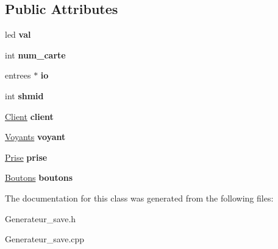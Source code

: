 \subsection*{Public Attributes}
\begin{DoxyCompactItemize}
\item 
\mbox{\label{classGenerateurSave_a0f29d24e65c8a4abcd21fc7a141b22cd}} 
led {\bfseries val}
\item 
\mbox{\label{classGenerateurSave_a86161d952d4ad4668922422380f2e355}} 
int {\bfseries num\+\_\+carte}
\item 
\mbox{\label{classGenerateurSave_a957ab62ae82d22910478012e94ee6d16}} 
entrees $\ast$ {\bfseries io}
\item 
\mbox{\label{classGenerateurSave_a1a33c9ad705f86b7e2057ec804aeb796}} 
int {\bfseries shmid}
\item 
\mbox{\label{classGenerateurSave_ae97b445adbbfa2619b01c4206086e0d9}} 
\hyperlink{classClient}{Client} {\bfseries client}
\item 
\mbox{\label{classGenerateurSave_ad1e236f69988266b8a84f2ff02f283ae}} 
\hyperlink{classVoyants}{Voyants} {\bfseries voyant}
\item 
\mbox{\label{classGenerateurSave_a9598290aa5ed72895a8c723c32c06167}} 
\hyperlink{classPrise}{Prise} {\bfseries prise}
\item 
\mbox{\label{classGenerateurSave_a5d4f692d6f98584d6ae44db2644cbd18}} 
\hyperlink{classBoutons}{Boutons} {\bfseries boutons}
\end{DoxyCompactItemize}


The documentation for this class was generated from the following files\+:\begin{DoxyCompactItemize}
\item 
Generateur\+\_\+save.\+h\item 
Generateur\+\_\+save.\+cpp\end{DoxyCompactItemize}
